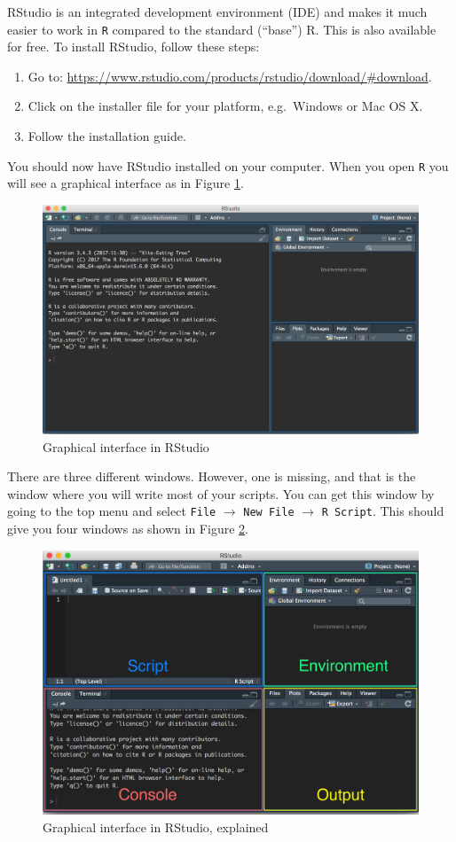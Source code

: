 \documentclass[12pt,oneside]{reedthesis}
\providecommand{\tightlist}{%
  \setlength{\itemsep}{0pt}\setlength{\parskip}{0pt}}
\theoremstyle{definition}
\theoremstyle{definition}
\theoremstyle{definition}
\theoremstyle{remark}
\begin{document}
  RStudio is an integrated development environment (IDE) and makes it much
  easier to work in \texttt{R} compared to the standard (``base'') R. This
  is also available for free. To install RStudio, follow these steps:
  \begin{enumerate}
  \def\labelenumi{\arabic{enumi}.}
  \tightlist
  \item
    Go to:
    \url{https://www.rstudio.com/products/rstudio/download/\#download}.
  \item
    Click on the installer file for your platform, e.g.~Windows or Mac OS
    X.
  \item
    Follow the installation guide.
  \end{enumerate}
  You should now have RStudio installed on your computer. When you open
  \texttt{R} you will see a graphical interface as in Figure
  \ref{fig:interface}.
  \begin{figure}
  \includegraphics[width=1\linewidth]{fig/rstudio} \caption{Graphical interface in RStudio}\label{fig:interface}
  \end{figure}
  There are three different windows. However, one is missing, and that is
  the window where you will write most of your scripts. You can get this
  window by going to the top menu and select \texttt{File} \(\rightarrow\)
  \texttt{New\ File} \(\rightarrow\) \texttt{R\ Script}. This should give
  you four windows as shown in Figure \ref{fig:interfaceexplain}.
  \begin{figure}
  \includegraphics[width=1\linewidth]{fig/rstudio_env} \caption{Graphical interface in RStudio, explained}\label{fig:interfaceexplain}
  \end{figure}
\end{document}
